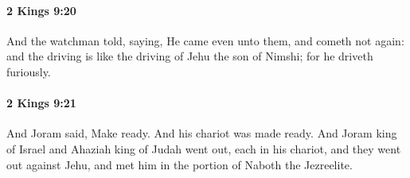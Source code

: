 		\paragraph{2 Kings 9:20} %
			\label{2KINGS-9-20}

			And the watchman told, saying, He came even unto them, and cometh not again: and the driving is like the driving of Jehu the son of Nimshi; for he driveth furiously.


		\paragraph{2 Kings 9:21} %
			\label{2KINGS-9-21}

			And Joram said, Make ready. And his chariot was made ready. And Joram king of Israel and Ahaziah king of Judah went out, each in his chariot, and they went out against Jehu, and met him in the portion of Naboth the Jezreelite.

